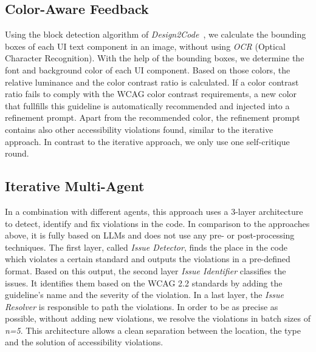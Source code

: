 \subsection{Color-Aware Feedback}
Using the block detection algorithm of \textit{Design2Code}~\parencite{si2024design2code},
we calculate the bounding boxes of each UI text component in an image, without 
using \textit{OCR} (Optical Character 
Recognition). With the help of the bounding boxes, we determine the font 
and background color of each UI component. Based on those colors,
the relative luminance and the color contrast ratio is calculated. If a 
color contrast ratio fails to comply with the WCAG color contrast requirements, 
a new color that fullfills this guideline is automatically recommended and 
injected into a refinement prompt.\newline
Apart from the recommended color, the refinement prompt contains also 
other accessibility violations found, similar to the 
iterative approach. In contrast to the iterative approach, we only use 
one self-critique round.

\subsection{Iterative Multi-Agent}
In a combination with different agents, this approach uses a 3-layer architecture
to detect, identify and fix violations in the code. In comparison to the 
approaches above, it is fully based on LLMs and does not use any pre- or 
post-processing techniques. \newline
The first layer, called \textit{Issue Detector}, finds the place in the code which 
violates a certain standard and outputs the violations in a pre-defined format.
Based on this output, the second layer \textit{Issue Identifier} classifies the issues. 
It identifies them based on the WCAG 2.2 standards by 
adding the guideline's name and the severity of the violation. In a last 
layer, the \textit{Issue Resolver} is responsible to path the violations. 
In order to be 
as precise as possible, without adding new violations, we resolve the violations 
in batch sizes of \textit{n=5}.\newline
This architecture allows a clean separation between the location, the type and 
the solution of accessibility violations.

